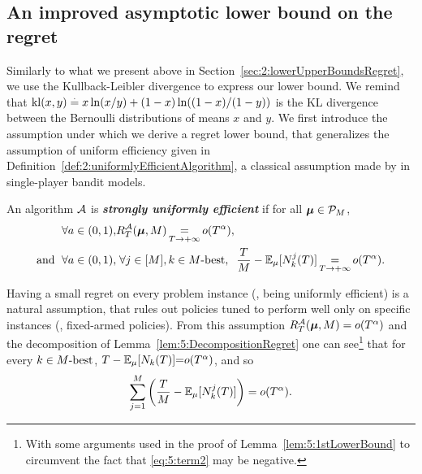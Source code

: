 \subsection{An improved asymptotic lower bound on the regret}
\label{sub:5:betterLowerBound}

Similarly to what we present above in Section~\ref{sec:2:lowerUpperBoundsRegret},
we use the Kullback-Leibler divergence to express our lower bound.
We remind that $\mathrm{kl}(x,y) \overset{.}{=} x\ln(x/y) + (1-x)\ln((1-x)/(1-y))$ is the KL divergence between the Bernoulli distributions of means $x$ and $y$.
%
We first introduce the assumption under which we derive a regret lower bound, that generalizes the assumption of uniform efficiency given in Definition~\ref{def:2:uniformlyEfficientAlgorithm},
a classical assumption made by \cite{LaiRobbins85} in single-player bandit models.
%
\begin{definition}\label{def:5:DecentralizedUniformEfficiency}
\begin{leftbar}[defnbar]  %
  An algorithm $\mathcal{A}$  is \emph{\textbf{strongly uniformly efficient}} if for all $\boldsymbol{\mu} \in \mathcal{P}_M$,
  \begin{align}
    \forall a\in(0,1), & R_T^{\mathcal{A}}(\boldsymbol{\mu},M) \mathop{=}\limits_{T \to +\infty} o(T^\alpha), \\
    \text{and } \; \forall a\in(0,1), & \;
    \forall j \in [M], k \in M\text{-}\mathrm{best}, \;\;
    \frac{T}{M}
    - \mathbb{E}_{\mu}[N_k^j(T)] \mathop{=}\limits_{T \to +\infty} o(T^{\alpha}).
    \label{eq:5:SUE}
  \end{align}
\end{leftbar}  %
\end{definition}


Having a small regret on every problem instance (\ie, being uniformly efficient)
is a natural assumption,
that rules out policies tuned to perform well only on specific instances (\eg, fixed-armed policies).
%
From this assumption $R_T^{\mathcal{A}}(\boldsymbol{\mu},M)=o(T^\alpha)$ and the decomposition of Lemma~\ref{lem:5:DecompositionRegret} one can see\footnote{With some arguments used in the proof of Lemma~\ref{lem:5:1stLowerBound} to circumvent the fact that \ref{eq:5:term2} may be negative.} that for every $k \in M\text{-}\mathrm{best}$,
${T}- \mathbb{E}_{\mu}[N_k(T)] {=} o(T^{\alpha})$, and so
\begin{equation}\label{eq:5:intermediate}
  \sum_{j =1}^M\left(\frac{T}{M} - \mathbb{E}_{\mu}[N_k^j(T)]\right) = o(T^{\alpha}).
\end{equation}

